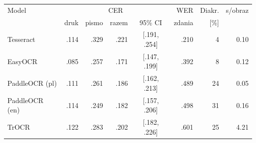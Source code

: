 \begin{tabular}{lrrrcrrr}
\toprule
Model & \multicolumn{4}{c}{CER} & WER & Diakr. & s/obraz \\
 & druk & pismo & razem & 95\% CI & zdania & [\%] & \\
\midrule
Tesseract & .114 & .329 & .221 & [.191, .254] & .210 & 4 & 0.10 \\
EasyOCR & .085 & .257 & .171 & [.147, .199] & .392 & 8 & 0.12 \\
PaddleOCR (pl) & .111 & .261 & .186 & [.162, .213] & .489 & 24 & 0.05 \\
PaddleOCR (en) & .114 & .249 & .182 & [.157, .206] & .498 & 31 & 0.16 \\
TrOCR & .122 & .283 & .202 & [.182, .226] & .601 & 25 & 4.21 \\
\bottomrule
\end{tabular}
